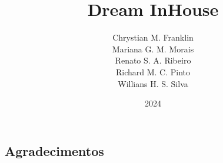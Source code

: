 \documentclass{article}
\title{{\Huge Dream InHouse}}
\author{
    Chrystian M. Franklin\\
    Mariana G. M. Morais\\
    Renato S. A. Ribeiro\\
    Richard M. C. Pinto\\
    Willians H. S. Silva
}
\date{2024}
\begin{document}
\maketitle
\pagebreak
\begin{centering}
    \justifying
    \section*{Agradecimentos}
\end{centering}
\pagebreak
\listoffigures
\pagebreak
\tableofcontents
\pagebreak

\pagebreak

\pagebreak

\pagebreak

\pagebreak

\pagebreak

\end{document}
